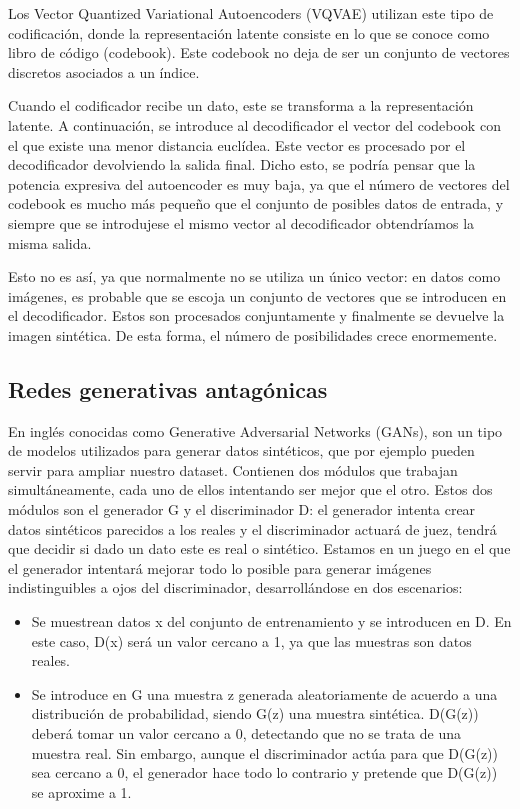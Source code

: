 Los Vector Quantized Variational Autoencoders (VQVAE) utilizan este tipo de codificación, donde la representación latente consiste en lo que se conoce como libro de código (codebook). Este codebook no deja de ser un conjunto de vectores discretos asociados a un índice.

Cuando el codificador recibe un dato, este se transforma a la representación latente. A continuación, se introduce al decodificador el vector del codebook con el que existe una menor distancia euclídea. Este vector es procesado por el decodificador devolviendo la salida final. Dicho esto, se podría pensar que la potencia expresiva del autoencoder es muy baja, ya que el número de vectores del codebook es mucho más pequeño que el conjunto de posibles datos de entrada, y siempre que se introdujese el mismo vector al decodificador obtendríamos la misma salida.

Esto no es así, ya que normalmente no se utiliza un único vector: en datos como imágenes, es probable que se escoja un conjunto de vectores que se introducen en el decodificador. Estos son procesados conjuntamente y finalmente se devuelve la imagen sintética. De esta forma, el número de posibilidades crece enormemente. \cite{vqvae}

\subsection{Redes generativas antagónicas}
En inglés conocidas como Generative Adversarial Networks (GANs), son un tipo de modelos utilizados para generar datos sintéticos, que por ejemplo pueden servir para ampliar nuestro dataset. Contienen dos módulos que trabajan simultáneamente, cada uno de ellos intentando ser mejor que el otro. Estos dos módulos son el generador G y el discriminador D: el generador intenta crear datos sintéticos parecidos a los reales y el discriminador actuará de juez, tendrá que decidir si dado un dato este es real o sintético.
Estamos en un juego en el que el generador intentará mejorar todo lo posible para generar imágenes indistinguibles a ojos del discriminador, desarrollándose en dos escenarios:

\begin{itemize}
    \item Se muestrean datos x del conjunto de entrenamiento y se introducen en D. En este caso, D(x) será un valor cercano a 1, ya que las muestras son datos reales.
    \item Se introduce en G una muestra z generada aleatoriamente de acuerdo a una distribución de probabilidad, siendo G(z) una muestra sintética. D(G(z)) deberá tomar un valor cercano a 0, detectando que no se trata de una muestra real. Sin embargo, aunque el discriminador actúa para que D(G(z)) sea cercano a 0, el generador hace todo lo contrario y pretende que D(G(z)) se aproxime a 1.
\end{itemize}

